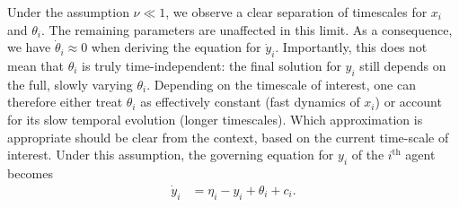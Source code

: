 \documentclass[reprint,amsmath,amssymb,aps]{revtex4-2}
\begin{document}







Under the assumption $\nu \ll 1$, we observe a clear separation of timescales for $x_i$ and $\theta_i$. The remaining parameters are unaffected in this limit. As a consequence, we have $\dot{\theta}_i \approx 0$ when deriving the equation for $\dot{y}_i$.
Importantly, this does not mean that $\theta_i$ is truly time-independent: 
the final solution for $y_i$ still depends on the full, slowly varying $\theta_i$. 
Depending on the timescale of interest, one can therefore either treat $\theta_i$ as effectively constant (fast dynamics of $x_i$) 
or account for its slow temporal evolution (longer timescales).
Which approximation is appropriate should be clear from the context, based on the current time-scale of interest.
Under this assumption, the governing equation for $y_i$ of the $i^{\text{th}}$ agent becomes
\begin{align}
\label{eq:y_system}
    \dot{y}_i &= \eta_i - y_i + \theta_i + c_i .
\end{align}
\end{document}
